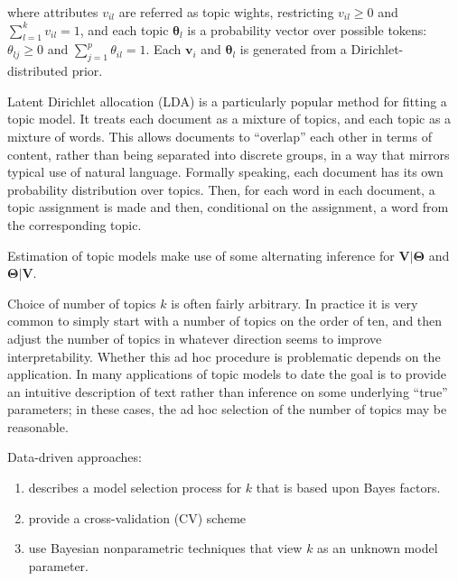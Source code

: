 \documentclass[12pt,a4paper,notitlepage]{article}
\begin{document}
where attributes $v_{il}$ are referred as topic wights, restricting $v_{il}\geq 0$ and $\sum^k_{l=1}v_{il}=1$, and each topic $\boldsymbol{\theta}_l$ is a probability vector over possible tokens: $\theta_{lj}\geq 0$ and $\sum^p_{j=1}\theta_{il}=1$. Each $\boldsymbol{v}_i$ and $\boldsymbol{\theta}_l$ is generated from a Dirichlet-distributed prior.

Latent Dirichlet allocation (LDA) is a particularly popular method for fitting a topic model. It treats each document as a mixture of topics, and each topic as a mixture of words. This allows documents to “overlap” each other in terms of content, rather than being separated into discrete groups, in a way that mirrors typical use of natural language. Formally speaking, each document has its own probability distribution over topics. Then, for each word in each document, a topic assignment is made and then, conditional on the assignment, a word from the corresponding topic. 

Estimation of topic models make use of some alternating inference for $\boldsymbol{V|\Theta}$ and $\boldsymbol{\Theta|V}$.

\begin{enumerate}
	\item Expectation-maximization algorithm (EM)
	Either maximize the likelihood implied by \ref{eq_1} and \ref{eq_2} or, after incorporating the usual Dirichlet priors on $\boldsymbol{v}_i$ and $\boldsymbol{\theta}_l$ \citep{taddy_estimation_2012} 
	\item Target full posterior distribution $p(\boldsymbol{\Theta,V|c}_i})$
\end{enumerate}

Choice of number of topics $k$ is often fairly arbitrary. In practice it is very common to simply start with a number of topics on the order of ten, and then adjust the number of topics in whatever direction seems to improve interpretability. Whether this ad hoc procedure is problematic depends on the application. In many applications of topic models to date the goal is to provide an intuitive description of text rather than inference on some underlying “true” parameters; in these cases, the ad hoc selection of the number of topics may be reasonable.

Data-driven approaches: 
\begin{enumerate}
	\item \citet{taddy_estimation_2012} describes a model selection process for $k$ that is based upon Bayes factors.
	\item \citet{airoldi_reconceptualizing_2010} provide a cross-validation (CV) scheme
	\item \citet{teh_hierarchical_2006} use Bayesian nonparametric techniques that view $k$ as an unknown model parameter.
\end{enumerate}
\end{document}
